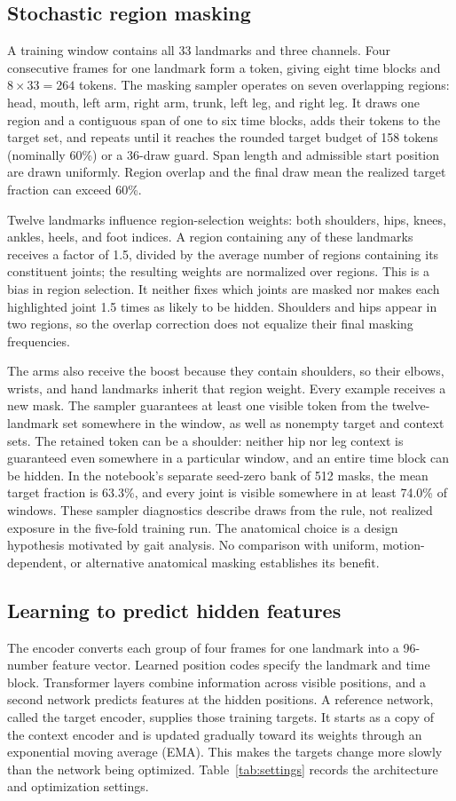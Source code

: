 \documentclass[10pt,twocolumn,letterpaper]{article}
\begin{document}
\subsection{Stochastic region masking}
A training window contains all 33 landmarks and three channels. Four consecutive frames for one landmark form a token, giving eight time blocks and $8\times33=264$ tokens. The masking sampler operates on seven overlapping regions: head, mouth, left arm, right arm, trunk, left leg, and right leg. It draws one region and a contiguous span of one to six time blocks, adds their tokens to the target set, and repeats until it reaches the rounded target budget of 158 tokens (nominally 60\%) or a 36-draw guard. Span length and admissible start position are drawn uniformly. Region overlap and the final draw mean the realized target fraction can exceed 60\%.

Twelve landmarks influence region-selection weights: both shoulders, hips, knees, ankles, heels, and foot indices. A region containing any of these landmarks receives a factor of 1.5, divided by the average number of regions containing its constituent joints; the resulting weights are normalized over regions. This is a bias in region selection. It neither fixes which joints are masked nor makes each highlighted joint 1.5 times as likely to be hidden. Shoulders and hips appear in two regions, so the overlap correction does not equalize their final masking frequencies.

The arms also receive the boost because they contain shoulders, so their elbows, wrists, and hand landmarks inherit that region weight. Every example receives a new mask. The sampler guarantees at least one visible token from the twelve-landmark set somewhere in the window, as well as nonempty target and context sets. The retained token can be a shoulder: neither hip nor leg context is guaranteed even somewhere in a particular window, and an entire time block can be hidden. In the notebook's separate seed-zero bank of 512 masks, the mean target fraction is 63.3\%, and every joint is visible somewhere in at least 74.0\% of windows. These sampler diagnostics describe draws from the rule, not realized exposure in the five-fold training run. The anatomical choice is a design hypothesis motivated by gait analysis. No comparison with uniform, motion-dependent, or alternative anatomical masking establishes its benefit.

\subsection{Learning to predict hidden features}
The encoder converts each group of four frames for one landmark into a 96-number feature vector. Learned position codes specify the landmark and time block. Transformer layers combine information across visible positions, and a second network predicts features at the hidden positions. A reference network, called the target encoder, supplies those training targets. It starts as a copy of the context encoder and is updated gradually toward its weights through an exponential moving average (EMA). This makes the targets change more slowly than the network being optimized. Table~\ref{tab:settings} records the architecture and optimization settings.
\end{document}
